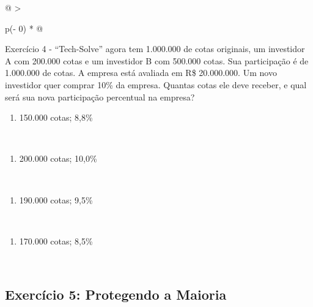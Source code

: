 \documentclass[
]{book}
\providecommand{\tightlist}{%
  \setlength{\itemsep}{0pt}\setlength{\parskip}{0pt}}
\begin{document}
\begin{longtable}[]{@{}
  >{\raggedright\arraybackslash}p{(\columnwidth - 0\tabcolsep) * }@{}}
\toprule\noalign{}
\endhead
\bottomrule\noalign{}
\endlastfoot
Exercício 4 - ``Tech-Solve'' agora tem 1.000.000 de cotas originais, um investidor A com 200.000 cotas e um investidor B com 500.000 cotas. Sua participação é de 1.000.000 de cotas. A empresa está avaliada em R\$ 20.000.000. Um novo investidor quer comprar 10\% da empresa. Quantas cotas ele deve receber, e qual será sua nova participação percentual na empresa? \\
\begin{minipage}[t]{\linewidth}\raggedright
\begin{enumerate}
\def\labelenumi{\alph{enumi})}
\tightlist
\item
  150.000 cotas; 8,8\%
\end{enumerate}
\end{minipage} \\
\begin{minipage}[t]{\linewidth}\raggedright
\begin{enumerate}
\def\labelenumi{\alph{enumi})}
\setcounter{enumi}{1}
\tightlist
\item
  200.000 cotas; 10,0\%
\end{enumerate}
\end{minipage} \\
\begin{minipage}[t]{\linewidth}\raggedright
\begin{enumerate}
\def\labelenumi{\alph{enumi})}
\setcounter{enumi}{2}
\tightlist
\item
  190.000 cotas; 9,5\%
\end{enumerate}
\end{minipage} \\
\begin{minipage}[t]{\linewidth}\raggedright
\begin{enumerate}
\def\labelenumi{\alph{enumi})}
\setcounter{enumi}{3}
\tightlist
\item
  170.000 cotas; 8,5\%
\end{enumerate}
\end{minipage} \\
\end{longtable}

\subsection{Exercício 5: Protegendo a Maioria}\label{exercuxedcio-5-protegendo-a-maioria}
\end{document}
